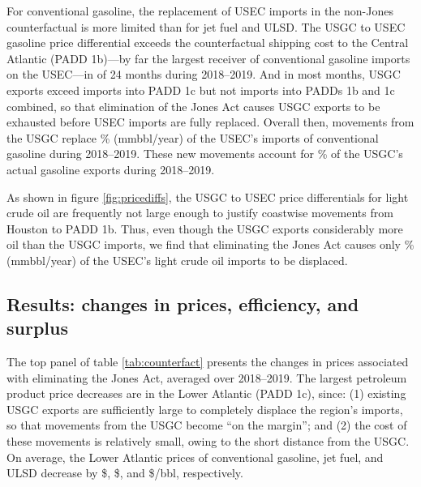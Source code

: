 \documentclass[12pt]{article}
\begin{document}
For conventional gasoline, the replacement of USEC imports in the non-Jones counterfactual is more limited than for jet fuel and ULSD. The USGC to USEC gasoline price differential exceeds the counterfactual shipping cost to the Central Atlantic (PADD 1b)---by far the largest receiver of conventional gasoline imports on the USEC---in of 24 months during 2018--2019. And in most months, USGC exports exceed imports into PADD 1c but not imports into PADDs 1b and 1c combined, so that elimination of the Jones Act causes USGC exports to be exhausted before USEC imports are fully replaced. Overall then, movements from the USGC replace \unskip\% (mmbbl/year) of the USEC's imports of conventional gasoline during 2018--2019. These new movements account for \unskip\% of the USGC's actual gasoline exports during 2018--2019.

As shown in figure \ref{fig:pricediffs}, the USGC to USEC price differentials for light crude oil are frequently not large enough to justify coastwise movements from Houston to PADD 1b. Thus, even though the USGC exports considerably more oil than the USGC imports, we find that eliminating the Jones Act causes only \unskip\% (mmbbl/year) of the USEC's light crude oil imports to be displaced.



\subsection{Results: changes in prices, efficiency, and surplus} \label{sec:Count_results_surplus}

The top panel of table \ref{tab:counterfact} presents the changes in prices associated with eliminating the Jones Act, averaged over 2018--2019. The largest petroleum product price decreases are in the Lower Atlantic (PADD 1c), since: (1) existing USGC exports are sufficiently large to completely displace the region's imports, so that movements from the USGC become ``on the margin''; and (2) the cost of these movements is relatively small, owing to the short distance from the USGC. On average, the Lower Atlantic prices of conventional gasoline, jet fuel, and ULSD decrease by \$\unskip, \$\unskip, and \$\unskip/bbl, respectively.
\end{document}
